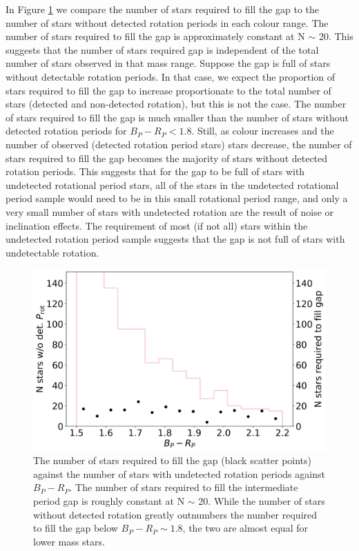 In Figure \ref{fig:stars_not_fill} we compare the number of stars required to fill the gap to the number of stars without detected rotation periods in each colour range.
The number of stars required to fill the gap is approximately constant at N $\sim$ 20.
This suggests that the number of stars required gap is independent of the total number of stars observed in that mass range.
Suppose the gap is full of stars without detectable rotation periods.
In that case, we expect the proportion of stars required to fill the gap to increase proportionate to the total number of stars (detected and non-detected rotation), but this is not the case.
The number of stars required to fill the gap is much smaller than the number of stars without detected rotation periods for $B_P-R_P<1.8$. 
Still, as colour increases and the number of observed (detected rotation period stars) stars decrease, the number of stars required to fill the gap becomes the majority of stars without detected rotation periods.
This suggests that for the gap to be full of stars with undetected rotational period stars, all of the stars in the undetected rotational period sample would need to be in this small rotational period range, and only a very small number of stars with undetected rotation are the result of noise or inclination effects.
The requirement of most (if not all) stars within the undetected rotation period sample suggests that the gap is not full of stars with undetectable rotation.

\begin{figure}
\centering
  \includegraphics[width=\textwidth]{Figures/rot_gap_figures/stars_donot_fullgap.png}
  \caption{
  	The number of stars required to fill the gap (black scatter points) against the number of stars with undetected rotation periods against $B_P-R_P$. The number of stars required to fill the intermediate period gap is roughly constant at N $\sim$ 20. While the number of stars without detected rotation greatly outnumbers the number required to fill the gap below $B_P-R_P \sim 1.8$, the two are almost equal for lower mass stars.
}
  \label{fig:stars_not_fill}
\end{figure}


